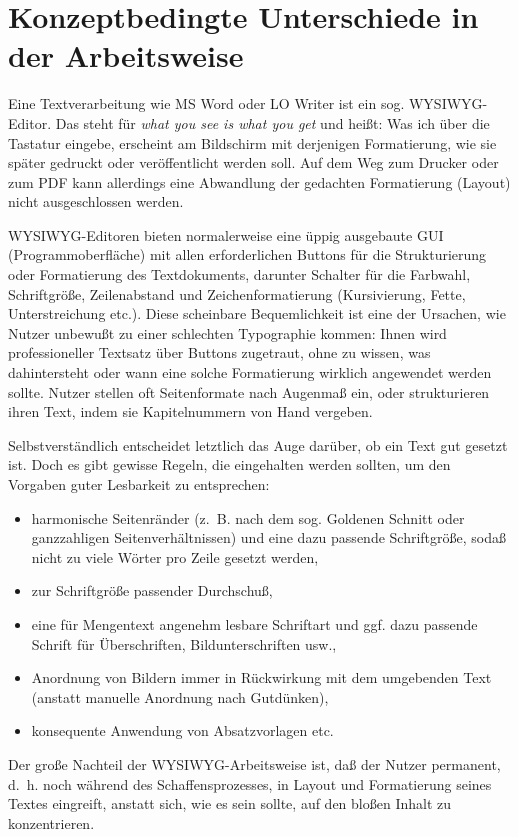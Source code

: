 \documentclass[11pt,a4paper,ngerman,DIV=8]{scrartcl}
\begin{document}
\section{Konzeptbedingte Unterschiede in der Arbeitsweise}\label{sec:arbeitsweise}

Eine Textverarbeitung wie MS Word oder LO Writer ist ein sog. WYSIWYG-Editor. Das steht für \emph{what you see is what you get} und heißt: Was ich über die Tastatur eingebe, erscheint am Bildschirm mit derjenigen Formatierung, wie sie später gedruckt oder veröffentlicht werden soll. Auf dem Weg zum Drucker oder zum PDF kann allerdings eine Abwandlung der gedachten Formatierung (Layout) nicht ausgeschlossen werden.

WYSIWYG-Editoren bieten normalerweise eine üppig ausgebaute GUI (Programmoberfläche) mit allen erforderlichen Buttons für die Strukturierung oder Formatierung des Textdokuments, darunter Schalter für die Farbwahl, Schriftgröße, Zeilenabstand und Zeichenformatierung (Kursivierung, Fette, Unterstreichung etc.). Diese scheinbare Bequemlichkeit ist eine der Ursachen, wie Nutzer unbewußt zu einer schlechten Typographie kommen: Ihnen wird professioneller Textsatz über Buttons zugetraut, ohne zu wissen, was dahintersteht oder wann eine solche Formatierung wirklich angewendet werden sollte. Nutzer stellen oft Seitenformate nach Augenmaß ein, oder strukturieren ihren Text, indem sie Kapitelnummern von Hand vergeben.

Selbstverständlich entscheidet letztlich das Auge darüber, ob ein Text gut gesetzt ist. Doch es gibt gewisse Regeln, die eingehalten werden sollten, um den Vorgaben guter Lesbarkeit zu entsprechen:

\begin{itemize}
  \item harmonische Seitenränder (z.~B. nach dem sog. Goldenen Schnitt oder ganzzahligen Seitenverhältnissen) und eine dazu passende Schriftgröße, sodaß nicht zu viele Wörter pro Zeile gesetzt werden,
  \item zur Schriftgröße passender Durchschuß,
  \item eine für Mengentext angenehm lesbare Schriftart und ggf. dazu passende Schrift für Überschriften, Bildunterschriften usw.,
  \item Anordnung von Bildern immer in Rückwirkung mit dem umgebenden Text (anstatt manuelle Anordnung nach Gutdünken),
  \item konsequente Anwendung von Absatzvorlagen etc.
\end{itemize}
Der große Nachteil der WYSIWYG-Arbeitsweise ist, daß der Nutzer permanent, d.~h. noch während des Schaffensprozesses, in Layout und Formatierung seines Textes eingreift, anstatt sich, wie es sein sollte, auf den bloßen Inhalt zu konzentrieren.
\end{document}

